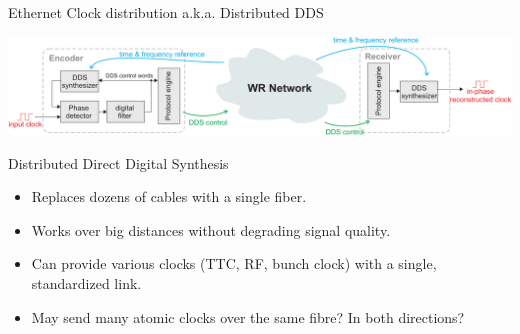 \documentclass[compress,red]{beamer}
\begin{document}
\begin{frame}{Ethernet Clock distribution a.k.a. Distributed DDS}
  \begin{center}
    \includegraphics[width=\columnwidth]{../../figures/applications/remote_dds.pdf}
  \end{center}
  \begin{block}{Distributed Direct Digital Synthesis}
    \begin{itemize}
    \item Replaces dozens of cables with a single fiber.
    \item Works over big distances without degrading signal quality.
    \item Can provide various clocks (TTC, RF, bunch clock) with a single, standardized link.
    \item May send many atomic clocks over the same fibre? In both directions?
    \end{itemize}
  \end{block}
\end{frame}



\end{document}
